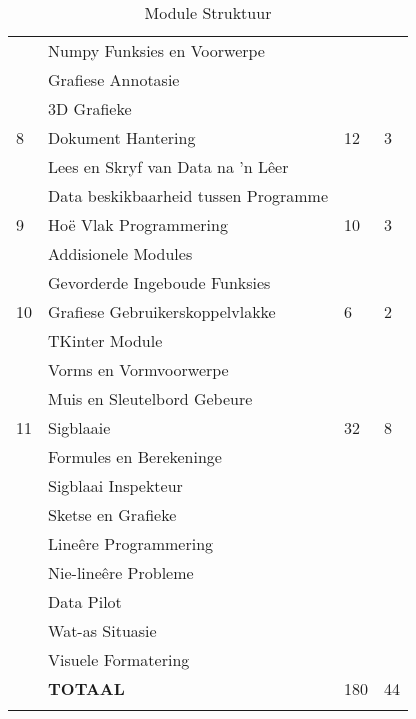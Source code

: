 \begin{longtable}{|p{1.4cm}|p{8.4cm}|p{2.2cm}|p{1.8cm}|}
                & \qquad Numpy Funksies en Voorwerpe           &    &    \\
                & \qquad Grafiese Annotasie                    &    &    \\
                & \qquad 3D Grafieke                           &    &    \\
             \hline
             8  & Dokument Hantering                           & 12 & 3  \\
                & \qquad Lees en Skryf van Data na 'n L\^eer   &    &    \\
                & \qquad Data beskikbaarheid tussen Programme  &    &    \\
             \hline
             9  & Ho\"{e} Vlak Programmering                   & 10 & 3  \\
                & \qquad Addisionele Modules                   &    &    \\
                & \qquad Gevorderde Ingeboude Funksies         &    &    \\
             \hline
             10 & Grafiese Gebruikerskoppelvlakke              & 6  & 2  \\
                & \qquad TKinter Module                        &    &    \\
                & \qquad Vorms en Vormvoorwerpe                &    &    \\
                & \qquad Muis en Sleutelbord Gebeure           &    &    \\
             \hline
             11 & Sigblaaie                                    & 32 & 8  \\
                & \qquad Formules en Berekeninge               &    &    \\
                & \qquad Sigblaai Inspekteur                   &    &    \\
                & \qquad Sketse en Grafieke                    &    &    \\
                & \qquad Line\^{e}re Programmering             &    &    \\
                & \qquad Nie-line\^{e}re Probleme              &    &    \\
                & \qquad Data Pilot                            &    &    \\
                & \qquad Wat-as Situasie                       &    &    \\
                & \qquad Visuele Formatering                   &    &    \\
             \hline
                & {\bf TOTAAL}                                 &180 & 44 \\
             \hline
         \caption[Module Struktuur]{Module Struktuur} \label{tab:study_comp}
        \end{longtable}

